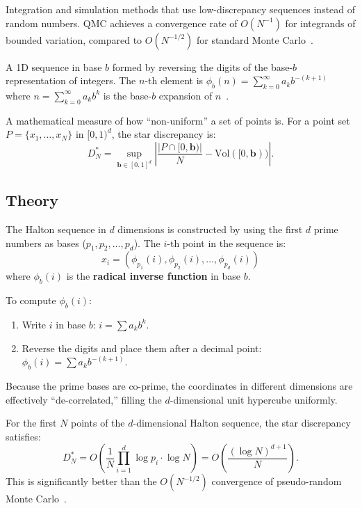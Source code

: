 \begin{definition}\label{def:quasi_monte_carlo}
Integration and simulation methods that use low-discrepancy sequences instead of random numbers. QMC achieves a convergence rate of $O(N^{-1})$ for integrands of bounded variation, compared to $O(N^{-1/2})$ for standard Monte Carlo~\cite{halton1960}.
\end{definition}

\begin{definition}\label{def:van_der_corput_sequence}
A 1D sequence in base $b$ formed by reversing the digits of the base-$b$ representation of integers. The $n$-th element is $\phi_b(n) = \sum_{k=0}^{\infty} a_k b^{-(k+1)}$ where $n = \sum_{k=0}^{\infty} a_k b^k$ is the base-$b$ expansion of $n$~\cite{vandercorput1935}.
\end{definition}

\begin{definition}[Discrepancy]\label{def:discrepancy}
A mathematical measure of how ``non-uniform'' a set of points is. For a point set $P = \{x_1, \ldots, x_N\}$ in $[0,1)^d$, the star discrepancy is:
\[
D_N^* = \sup_{\mathbf{b} \in [0,1]^d} \left| \frac{|P \cap [0, \mathbf{b})|}{N} - \text{Vol}([0, \mathbf{b})) \right|.
\]
\end{definition}

\subsection{Theory}
The Halton sequence in $d$ dimensions is constructed by using the first $d$ prime numbers as bases ($p_1, p_2, \dots, p_d$). The $i$-th point in the sequence is:
$$x_i = (\phi_{p_1}(i), \phi_{p_2}(i), \dots, \phi_{p_d}(i))$$
where $\phi_b(i)$ is the \textbf{radical inverse function} in base $b$.

To compute $\phi_b(i)$:
\begin{enumerate}
    \item Write $i$ in base $b$: $i = \sum a_k b^k$.
    \item Reverse the digits and place them after a decimal point: $\phi_b(i) = \sum a_k b^{-(k+1)}$.
\end{enumerate}

Because the prime bases are co-prime, the coordinates in different dimensions are effectively ``de-correlated,'' filling the $d$-dimensional unit hypercube uniformly.

\begin{theorem}\label{thm:halton_discrepancy}
For the first $N$ points of the $d$-dimensional Halton sequence, the star discrepancy satisfies:
\[
D_N^* = O\!\left(\frac{1}{N} \prod_{i=1}^{d} \log p_i \cdot \log N\right) = O\!\left(\frac{(\log N)^{d+1}}{N}\right).
\]
This is significantly better than the $O(N^{-1/2})$ convergence of pseudo-random Monte Carlo~\cite{halton1960,niederreiter1992}.
\end{theorem}

